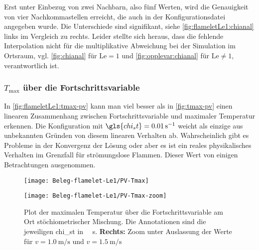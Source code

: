 Erst unter Einbezug von zwei Nachbarn, also fünf Werten, wird die Genauigkeit von vier Nachkommastellen erreicht, die auch in der Konfigurationsdatei angegeben wurde. Die Unterschiede sind signifikant, siehe \autoref{fig:flameletLe1:chianal} links im Vergleich zu rechts. Leider stellte sich heraus, dass die fehlende Interpolation nicht für die multiplikative Abweichung bei der Simulation im Ortsraum, vgl. \autoref{fig:chianal} für $\mathrm{Le}=1$ und \ref{fig:opplevar:chianal} für $\mathrm{Le}\neq1$, verantwortlich ist.


\subsubsection{\texorpdfstring{$T_\mathrm{max}$}{Tmax} über die Fortschrittsvariable}

In \autoref{fig:flameletLe1:tmax-pv} kann man viel besser als in \autoref{fig:tmax-pv} einen linearen Zusammenhang zwischen Fortschrittsvariable und maximaler Temperatur erkennen. Die Konfiguration mit $\gls{chi_st}=\SI{0.01}{\per\second}$ weicht als einzige aus unbekannten Gründen von diesem linearen Verhalten ab. Wahrscheinlich gibt es Probleme in der Konvergenz der Lösung oder aber es ist ein reales physikalisches Verhalten im Grenzfall für strömungslose Flammen. Dieser Wert von einigen Betrachtungen ausgenommen.

\begin{figure}[H]
    \begin{minipage}{0.5\linewidth}\begin{center}
        \texttt{[image: Beleg-flamelet-Le1/PV-Tmax]}
    \end{center}\end{minipage}\begin{minipage}{0.5\linewidth}\begin{center}
        \texttt{[image: Beleg-flamelet-Le1/PV-Tmax-zoom]}
    \end{center}\end{minipage}
    \caption{Plot der maximalen Temperatur über die Fortschrittsvariable am Ort stöchiometrischer Mischung. Die Annotationen sind die jeweiligen \gls{chi_st} in \SI{}{\per\second}. \textbf{Rechts:} Zoom unter Auslassung der Werte für $v=\SI{1.0}{\meter\per\second}$ und $v=\SI{1.5}{\meter\per\second}$}
    \label{fig:flameletLe1:tmax-pv}
\end{figure}

